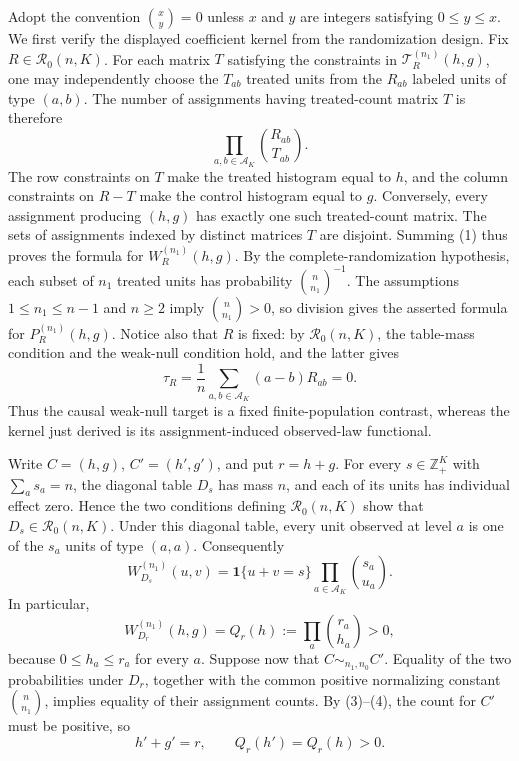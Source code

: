 Adopt the convention \(\binom{x}{y}=0\) unless \(x\) and \(y\) are
integers satisfying \(0\leq y\leq x\).  We first verify the displayed
coefficient kernel from the randomization design.  Fix
\(R\in\mathcal R_0(n,K)\).  For each matrix \(T\) satisfying the constraints
in \(\mathcal T_R^{(n_1)}(h,g)\), one may independently choose the
\(T_{ab}\) treated units from the \(R_{ab}\) labeled units of type \((a,b)\).
The number of assignments having treated-count matrix \(T\) is therefore
\[
 \prod_{a,b\in\mathcal A_K}\binom{R_{ab}}{T_{ab}}.
 \tag{1}
\]
The row constraints on \(T\) make the treated histogram equal to \(h\), and
the column constraints on \(R-T\) make the control histogram equal to \(g\).
Conversely, every assignment producing \((h,g)\) has exactly one such
treated-count matrix.  The sets of assignments indexed by distinct matrices
\(T\) are disjoint.  Summing (1) thus proves the formula for
\(W_R^{(n_1)}(h,g)\).  By the complete-randomization hypothesis, each subset
of \(n_1\) treated units has probability \(\binom n{n_1}^{-1}\).  The
assumptions \(1\leq n_1\leq n-1\) and \(n\geq2\) imply
\(\binom n{n_1}>0\), so division gives the asserted formula for
\(P_R^{(n_1)}(h,g)\).  Notice also that \(R\) is fixed: by
\(\mathcal R_0(n,K)\), the table-mass condition and the weak-null condition
hold, and the latter gives
\[
 \tau_R
 =\frac1n\sum_{a,b\in\mathcal A_K}(a-b)R_{ab}=0.
 \tag{2}
\]
Thus the causal weak-null target is a fixed finite-population contrast,
whereas the kernel just derived is its assignment-induced observed-law
functional.

Write \(C=(h,g)\), \(C'=(h',g')\), and put \(r=h+g\).  For every
\(s\in\mathbb Z_+^K\) with \(\sum_a s_a=n\), the diagonal table \(D_s\)
has mass \(n\), and each of its units has individual effect zero.  Hence the
two conditions defining \(\mathcal R_0(n,K)\) show that
\(D_s\in\mathcal R_0(n,K)\).  Under this diagonal table, every unit observed
at level \(a\) is one of the \(s_a\) units of type \((a,a)\).  Consequently
\[
 W_{D_s}^{(n_1)}(u,v)
 =\mathbf 1\{u+v=s\}\prod_{a\in\mathcal A_K}\binom{s_a}{u_a}.
 \tag{3}
\]
In particular,
\[
 W_{D_r}^{(n_1)}(h,g)
 =Q_r(h):=\prod_a\binom{r_a}{h_a}>0,
 \tag{4}
\]
because \(0\leq h_a\leq r_a\) for every \(a\).  Suppose now that
\(C\sim_{n_1,n_0}C'\).  Equality of the two probabilities under \(D_r\),
together with the common positive normalizing constant \(\binom n{n_1}\),
implies equality of their assignment counts.  By (3)--(4), the count for
\(C'\) must be positive, so
\[
 h'+g'=r,
 \qquad
 Q_r(h')=Q_r(h)>0.
 \tag{5}
\]

